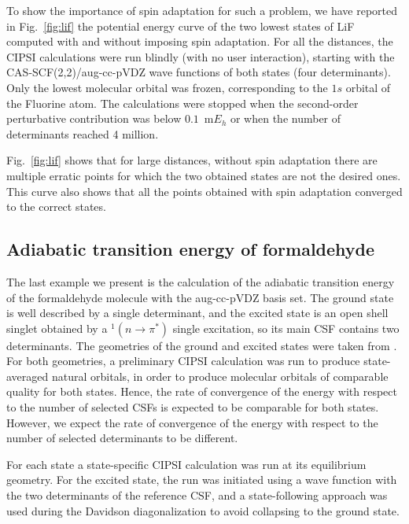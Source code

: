 \documentclass[aip,jcp,reprint,showkeys]{revtex4-1}
\newcommand{\cipsi}{CIPSI}
\newcommand{\csf}{CSF}
\begin{document}
To show the importance of spin adaptation for such a problem, we have reported
in Fig.~\ref{fig:lif} the potential energy curve of the two lowest states of
LiF computed with and without imposing spin adaptation. For all the distances,
the \cipsi{} calculations were run blindly (with no user interaction), starting
with the CAS-SCF(2,2)/aug-cc-pVDZ  wave functions of both states (four
determinants). Only the lowest molecular orbital was frozen, corresponding to
the $1s$ orbital of the Fluorine atom. The calculations were stopped when the
second-order perturbative contribution was below $0.1$~m$E_h$ or when the
number of determinants reached 4 million.

Fig.~\ref{fig:lif} shows that for large distances, without spin adaptation
there are multiple erratic points for which the two obtained states are not
the desired ones. This curve also shows that all the points obtained with spin
adaptation converged to the correct states.

\subsection{Adiabatic transition energy of formaldehyde}

The last example we present is the calculation of the adiabatic transition
energy of the formaldehyde molecule with the aug-cc-pVDZ basis set.  The ground
state is well described by a single determinant, and the excited state is an
open shell singlet obtained by a $^1(n \rightarrow \pi^*)$ single excitation,
so its main {\csf} contains two determinants.  The geometries of the ground and
excited states were taken from \citet{Loos_2018}. For both geometries, a
preliminary \cipsi{} calculation was run to produce state-averaged natural
orbitals, in order to produce molecular orbitals of comparable quality for
both states. Hence, the rate of convergence of the energy with respect to the
number of selected \csf s is expected to be comparable for both states.
However, we expect the rate of convergence of the energy with respect to the
number of selected determinants to be different. 

For each state a state-specific \cipsi{} calculation was run at its equilibrium
geometry.
For the excited state, the run was initiated using a wave function with
the two determinants of the reference \csf , and a state-following approach was
used during the Davidson diagonalization to avoid collapsing to the ground state.
\end{document}
